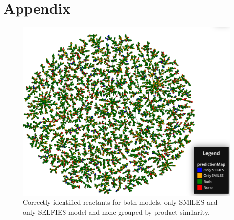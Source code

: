 \documentclass[10pt,conference,compsocconf]{IEEEtran}
\begin{document}
\section{Appendix}
\begin{figure}[t]
    \centering
    \includegraphics[width = .9\textwidth]{./figures/tree.png}
    \caption{Correctly identified reactants for both models, only SMILES and only SELFIES model and none grouped by product similarity.}
    \label{fig:tree}
\end{figure} 
\end{document}
